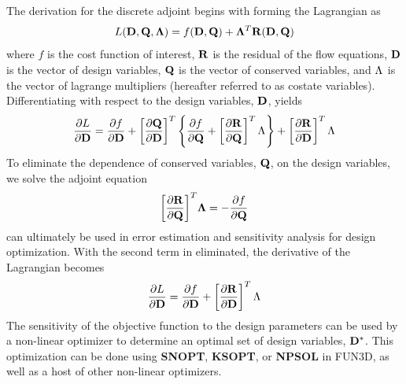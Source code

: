 The derivation for the discrete adjoint begins with forming the Lagrangian as
\begin{equation}
  L(\mathbf D,\mathbf Q,\mathbf{\Lambda})=f(\mathbf D,\mathbf Q)
  +\mathbf{\Lambda}^T\mathbf R(\mathbf D,\mathbf Q)
  \label{lagrangian}
\end{equation}
where $f$ is the cost function of interest, $\mathbf R$ is the residual of the flow
equations, $\mathbf D$ is the vector of design variables, $\mathbf Q$ is the vector of
conserved variables, and $\Lambda_{}$ is the vector of lagrange multipliers
(hereafter referred to as costate variables).  Differentiating with respect to
the design variables, $\mathbf D$, yields
\begin{equation}
  \frac{\partial L}{\partial \mathbf D} = 
  \frac{\partial f}{\partial \mathbf D} + \left[ \frac{\partial \mathbf Q}{\partial \mathbf D} \right]^T \left\{ 
    \frac{\partial f}{\partial \mathbf Q} + \left[ \frac{\partial \mathbf R_{}}{\partial \mathbf Q} \right]^T \Lambda_{}
  \right\}
  + \left[ \frac{\partial \mathbf R_{}}{\partial \mathbf D} \right]^T \Lambda_{}
  \label{dL}
\end{equation}
To eliminate the dependence of conserved variables, $\mathbf Q$, on the design
variables, we solve the adjoint equation
\begin{equation}
  \bigg[\frac{\partial \mathbf R}{\partial \mathbf Q}\bigg]^T\mathbf{\Lambda} = -\frac{\partial f}{\partial \mathbf Q}
  \label{adjoint-main}
\end{equation}
 can ultimately be used in error estimation and sensitivity analysis
for design optimization.  With the second term in  eliminated, the
derivative of the Lagrangian becomes
\begin{equation}
  \frac{\partial L}{\partial \mathbf D}=
  \frac{\partial f}{\partial \mathbf D} + \left[ \frac{\partial \mathbf R_{}}{\partial \mathbf D} \right]^T \Lambda_{}
  \label{obj-function}
\end{equation}
The sensitivity of the objective function to the design parameters can be used
by a non-linear optimizer to determine an optimal set of design variables,
$\mathbf D^*$. This optimization can be done using {\bf SNOPT\cite{snopt-manual}},
{\bf KSOPT\cite{KSOPT}}, or {\bf NPSOL\cite{npsol-manual}} in FUN3D, as well as
a host of other non-linear optimizers.


